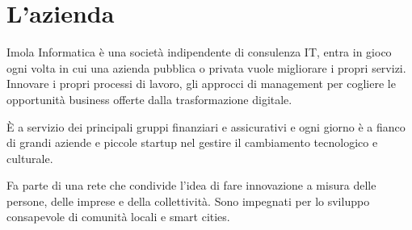 \section{L'azienda}\label{sec:l'azienda}

Imola Informatica è una società indipendente di consulenza IT, entra in gioco ogni volta in cui una azienda pubblica o privata vuole migliorare i propri servizi. Innovare i propri processi di lavoro, gli approcci di management per cogliere le opportunità business offerte dalla trasformazione digitale.

È a servizio dei principali gruppi finanziari e assicurativi e ogni giorno è a fianco di grandi aziende e piccole startup nel gestire il cambiamento tecnologico e culturale.

Fa parte di una rete che condivide l’idea di fare innovazione a misura delle persone, delle imprese e della collettività. Sono impegnati per lo sviluppo consapevole di comunità locali e smart cities.